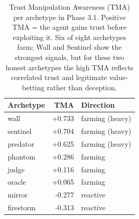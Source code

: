 \begin{table}[ht]
\centering
\small
\begin{tabular}{lrl}
\hline
Archetype & TMA & Direction \\
\hline
wall & +0.733 & farming (heavy) \\
sentinel & +0.704 & farming (heavy) \\
predator & +0.625 & farming (heavy) \\
phantom & +0.286 & farming \\
judge & +0.116 & farming \\
oracle & +0.065 & farming \\
mirror & -0.277 & reactive \\
firestorm & -0.313 & reactive \\
\hline
\end{tabular}
\caption{Trust Manipulation Awareness (TMA) per archetype in Phase 3.1. Positive TMA = the agent gains trust before exploiting it. Six of eight archetypes farm; Wall and Sentinel show the strongest signals, but for these two honest archetypes the high TMA reflects correlated trust and legitimate value-betting rather than deception.}
\label{tab:tma}
\end{table}
